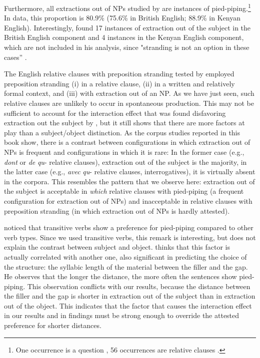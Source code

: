 Furthermore, all extractions out of NPs studied by \citet{Trotta.2000} are instances of pied-piping.\footnote{One occurrence is a question \citep[61]{Trotta.2000}, 56 occurrences are relative clauses \citep[184]{Trotta.2000}.} In  data, this proportion is 80.9\% (75.6\% in British English; 88.9\% in Kenyan English). Interestingly, \citeauthor{Hoffmann.2011} found 17 instances of extraction out of the subject in the British English component and 4 instances in the Kenyan English component, which are not included in his analysis, since "stranding is not an option in these cases'' \citep[119;fn.\ 3]{Hoffmann.2011}. 

The English relative clauses with preposition stranding tested by \citet{Abeille.2020.Cognition} employed preposition stranding (i) in a relative clause, (ii) in a written and relatively formal context, and (iii) with extraction out of an NP. As we have just seen, such relative clauses are unlikely to occur in spontaneous production. This may not be sufficient to account for the interaction effect that was found disfavoring extraction out the subject by \citeauthor{Abeille.2020.Cognition}, but it still shows that there are more factors at play than a subject/object distinction. As the corpus studies reported in this book show, there is a contrast between configurations in which extraction out of NPs is frequent and configurations in which it is rare: In the former case (e.g., \textit{dont} or \textit{de} \textit{qu}- relative clauses), extraction out of the subject is the majority, in the latter case (e.g., \textit{avec} \textit{qu}- relative clauses, interrogatives), it is virtually absent in the corpora.
This resembles the pattern that we observe here: extraction out of the subject is acceptable in \textit{which} relative clauses with pied-piping (a frequent configuration for extraction out of NPs) and inacceptable in relative clauses with preposition stranding (in which extraction out of NPs is hardly attested). 

\citet{Gries.2002} noticed that transitive verbs show a preference for pied-piping compared to other verb types. Since we used transitive verbs, this remark is interesting, but does not explain the contrast between subject and object.
\citeauthor{Gries.2002} thinks that this factor is actually correlated with another one, also significant in predicting the choice of the structure: the syllabic length of the material between the filler and the gap. He observes that the longer the distance, the more often the sentences show pied-piping. This observation conflicts with our results, because the distance between the filler and the gap is shorter in extraction out of the subject than in extraction out of the object. This indicates that the factor that causes the interaction effect in our results and in  findings must be strong enough to override the attested preference for shorter distances.


